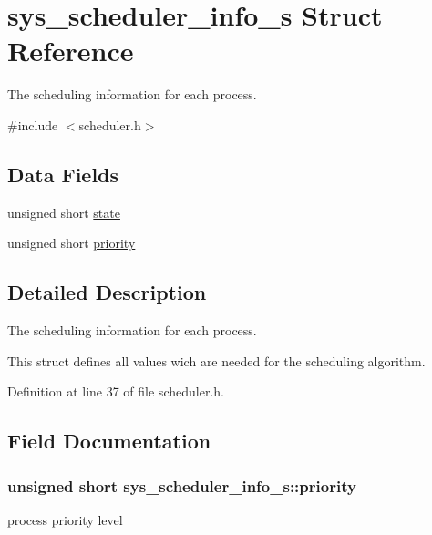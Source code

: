 \hypertarget{structsys__scheduler__info__s}{}\section{sys\+\_\+scheduler\+\_\+info\+\_\+s Struct Reference}
\label{structsys__scheduler__info__s}


The scheduling information for each process.  




{\ttfamily \#include $<$scheduler.\+h$>$}

\subsection*{Data Fields}
\begin{DoxyCompactItemize}
\item 
unsigned short \hyperlink{structsys__scheduler__info__s_a95d0294a71162ffbd1e65fd381e54a6b}{state}
\item 
unsigned short \hyperlink{structsys__scheduler__info__s_ad04085351f98898a0631e07aba0338d6}{priority}
\end{DoxyCompactItemize}


\subsection{Detailed Description}
The scheduling information for each process. 

This struct defines all values wich are needed for the scheduling algorithm. 

Definition at line 37 of file scheduler.\+h.



\subsection{Field Documentation}
\hypertarget{structsys__scheduler__info__s_ad04085351f98898a0631e07aba0338d6}{}
\subsubsection[{priority}]{\setlength{\rightskip}{0pt plus 5cm}unsigned short sys\+\_\+scheduler\+\_\+info\+\_\+s\+::priority}\label{structsys__scheduler__info__s_ad04085351f98898a0631e07aba0338d6}
process priority level 

